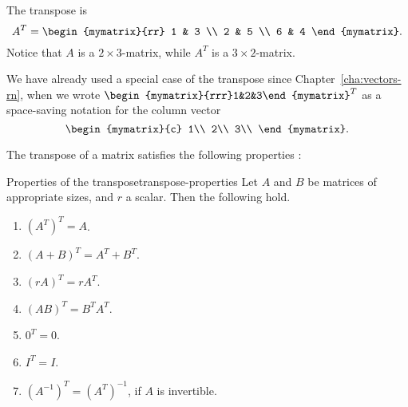 \begin{solution}
  The transpose is
  \begin{equation*}
    A^T =
    \begin{mymatrix}{rr}
      1 & 3 \\
      2 & 5 \\
      6 & 4
    \end{mymatrix}.
  \end{equation*}
  Notice that $A$ is a $2\times 3$-matrix, while $A^T$ is a
  $3\times 2$-matrix.
\end{solution}

We have already used a special case of the transpose since
Chapter~\ref{cha:vectors-rn}, when we wrote
$\begin{mymatrix}{rrr}1&2&3\end{mymatrix}^T$ as a space-saving
notation for the column vector
\begin{equation*}
  \begin{mymatrix}{c}
    1\\
    2\\
    3\\
  \end{mymatrix}.
\end{equation*}

The transpose of a matrix satisfies the following
properties%
%
%
:

\begin{lemma}{Properties of the transpose}{transpose-properties}
  Let $A$ and $B$ be matrices of appropriate sizes, and $r$ a
  scalar. Then the following hold.
  \begin{enumerate}
  \item $(A^T)^T = A$.
  \item $(A+B)^T=A^T+B^T$.\label{matrix-transpose-2}
  \item $(rA)^T=rA^T$.\label{matrix-transpose-3}
  \item $(AB)^T=B^TA^T$.\label{matrix-transpose-4}
  \item $0^T = 0$.
  \item $I^T = I$.
  \item $(A^{-1})^T = (A^T)^{-1}$, if $A$ is invertible.
  \end{enumerate}
\end{lemma}

